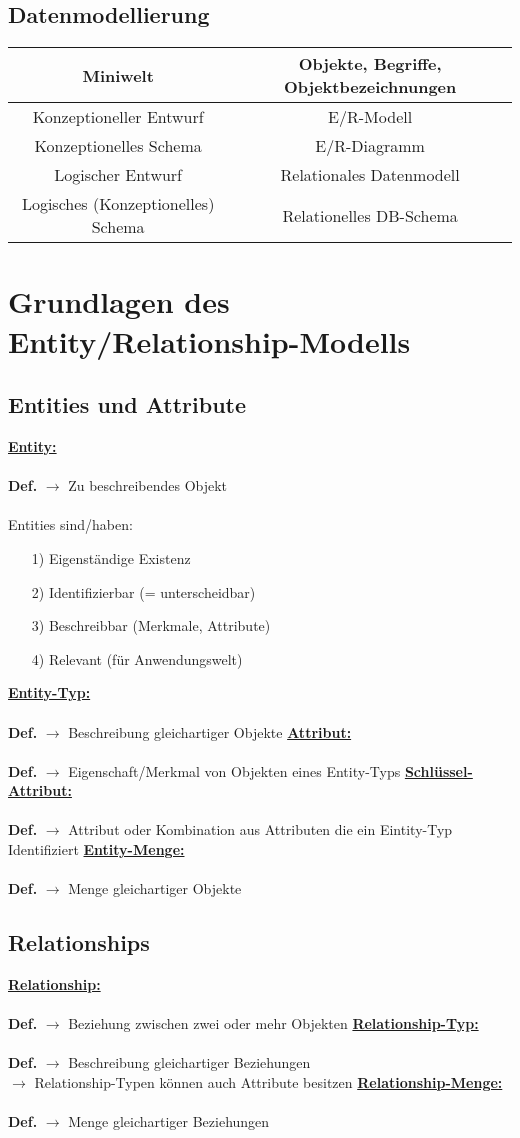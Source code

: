 \documentclass{article}
\newcommand{\Def}[2]{\indexspace\textbf{\underline{#1:}} \\ \\\textbf{Def.} $\rightarrow$ {#2}}
\newcommand{\DApp}[2]{\textbf{#1} $\rightarrow$ {#2}}
\begin{document}
    \subsection{Datenmodellierung}
    \begin{center}
        \begin{tabular}{ c | c }
            Miniwelt & Objekte, Begriffe, Objektbezeichnungen \\
            \hline
            Konzeptioneller Entwurf & E/R-Modell\\
            Konzeptionelles Schema & E/R-Diagramm \\
            \hline
            Logischer Entwurf & Relationales Datenmodell \\
            Logisches (Konzeptionelles) Schema & Relationelles DB-Schema
        \end{tabular}
    \end{center}

    \newpage
    \section{Grundlagen des Entity/Relationship-Modells}
    \subsection{Entities und Attribute}
    \Def{Entity}{Zu beschreibendes Objekt} \\ \\
    Entities sind/haben:
    \begin{itemize}
        \item[1)] Eigenständige Existenz
        \item[2)] Identifizierbar (= unterscheidbar)
        \item[3)] Beschreibbar (Merkmale, Attribute)
        \item[4)] Relevant (für Anwendungswelt)
    \end{itemize}
    \Def{Entity-Typ}{Beschreibung gleichartiger Objekte}
    \Def{Attribut}{Eigenschaft/Merkmal von Objekten eines Entity-Typs}
    \Def{Schlüssel-Attribut}{Attribut oder Kombination aus Attributen die ein Eintity-Typ Identifiziert}
    \Def{Entity-Menge}{Menge gleichartiger Objekte}

    \subsection{Relationships}
    \Def{Relationship}{Beziehung zwischen zwei oder mehr Objekten}
    \Def{Relationship-Typ}{Beschreibung gleichartiger Beziehungen} \\
    \DApp{}{Relationship-Typen können auch Attribute besitzen}
    \Def{Relationship-Menge}{Menge gleichartiger Beziehungen}
\end{document}
